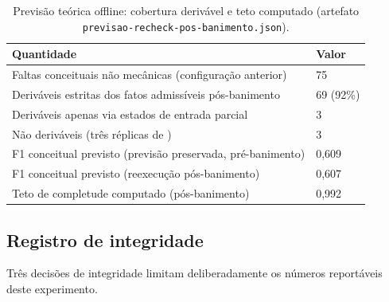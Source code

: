 \documentclass[11pt,a4paper]{article}
\begin{document}
\begin{table}[tbp]
\centering
\caption{Previsão teórica offline: cobertura derivável e teto computado (artefato \texttt{previsao-recheck-pos-banimento.json}).}
\label{tab:previsao}
\small
\setlength{\tabcolsep}{4pt}
\begin{tabularx}{\textwidth}{@{}Y R{2.6cm}@{}}
\toprule
Quantidade & Valor \\
\midrule
Faltas conceituais não mecânicas (configuração anterior) & 75 \\
Deriváveis estritas dos fatos admissíveis pós-banimento & 69 (92\%) \\
Deriváveis apenas via estados de entrada parcial & 3 \\
Não deriváveis (três réplicas de ) & 3 \\
F1 conceitual previsto (previsão preservada, pré-banimento) & 0,609 \\
F1 conceitual previsto (reexecução pós-banimento) & 0,607 \\
Teto de completude computado (pós-banimento) & 0,992 \\
\bottomrule
\end{tabularx}
\end{table}
\FloatBarrier

\subsection{Registro de integridade}
\label{sec:integridade}

Três decisões de integridade limitam deliberadamente os números reportáveis deste experimento.
\end{document}

